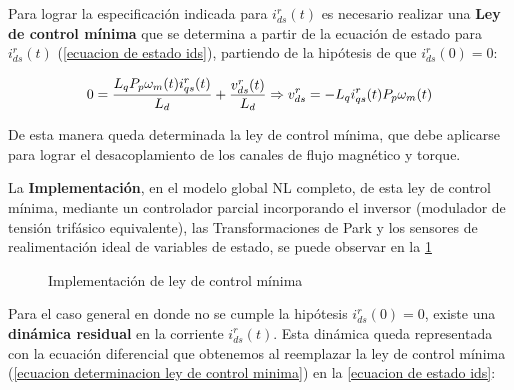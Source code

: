 \documentclass[a4paper, 10pt, onecolumn,journal]{ieeeconf}
\begin{document}
Para lograr la especificación indicada para $i^r_{ds}(t)$ es necesario realizar una \textbf{Ley de control mínima} que se determina a partir de la ecuación de estado para $i^{r}_{ds}(t)$ (\cref{ecuacion de estado ids}), partiendo de la hipótesis de que $i^{r}_{ds}(0)=0$:

\begin{equation}
	0= \frac{L_q P_p \omega_m(t)i^r_{qs}(t)}{L_d}  + \frac{v^r_{ds}(t)}{L_d}\Rightarrow	v^{r}_{ds}= -L_{q}i^{r}_{qs}(t)P_{p}\omega_{m}(t)\\
	\label{ecuacion determinacion ley de control minima}
\end{equation}

De esta manera queda determinada la ley de control mínima, que debe aplicarse para lograr el desacoplamiento de los canales de flujo magnético y torque.

La \textbf{Implementación}, en el modelo global NL completo, de esta  ley de control mínima, mediante un controlador parcial incorporando el inversor (modulador de tensión trifásico equivalente), las Transformaciones de Park y los sensores de realimentación ideal de variables de estado,
se puede observar en la \cref{Implementación de ley de control mínima}

\begin{figure}[thpb]
	\centering
	\begin{adjustbox}{max width=\columnwidth}
	\end{adjustbox}
	\caption{Implementación de ley de control mínima}
	\label{Implementación de ley de control mínima}
\end{figure}

Para el caso general en donde no se cumple la hipótesis $i^{r}_{ds}(0)=0$, existe una \textbf{dinámica residual} en la corriente $i^{r}_{ds}(t)$. Esta dinámica queda representada con la ecuación diferencial que obtenemos al reemplazar la ley de control mínima (\cref{ecuacion determinacion ley de control minima}) en la \cref{ecuacion de estado ids}:
\end{document}

